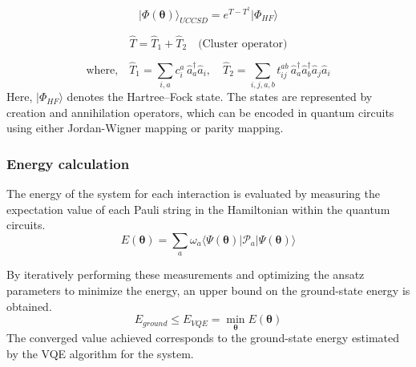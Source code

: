 \documentclass[pdflatex,sn-mathphys-num]{sn-jnl}%
\theoremstyle{thmstyleone}%
\theoremstyle{thmstyletwo}%
\theoremstyle{thmstylethree}%
\begin{document}
\begin{equation}
\vert \Phi(\mathbf{\theta})\rangle_{UCCSD} = e^{T-T^{\dagger}}\vert \Phi_{HF} \rangle
\end{equation}

\begin{equation}
\hat{T} = \hat{T}_1 + \hat{T}_2 \quad \text{(Cluster operator)}
\end{equation}

\begin{equation*}
\text{where,} \quad 
\hat{T}_1 = \sum_{i,a} c_i^a \, \hat{a}_a^{\dagger} \hat{a}_i, \quad
\hat{T}_2 = \sum_{i,j,a,b} t_{ij}^{ab} \, \hat{a}_a^{\dagger} \hat{a}_b^{\dagger} \hat{a}_j \hat{a}_i
\end{equation*}
Here, $\lvert \Phi_{HF} \rangle$ denotes the Hartree–Fock state. The states are represented by creation and annihilation operators, which can be encoded in quantum circuits using either Jordan-Wigner mapping or parity mapping. 

\subsubsection{Energy calculation}\label{subsec2.2.3}

The energy of the system for each interaction is evaluated by measuring the expectation value of each Pauli string in the Hamiltonian within the quantum circuits. 
\begin{equation}
E(\mathbf{\theta}) = \sum_{a} \omega_a \langle \Psi(\mathbf{\theta}) \vert \mathcal{P}_a \vert \Psi(\mathbf{\theta}) \rangle
\end{equation}

By iteratively performing these measurements and optimizing the ansatz parameters to minimize the energy,
an upper bound on the ground-state energy is obtained. 
\begin{equation}
E_{ground}\leq E_{VQE} = \min_{\mathbf{\theta}} E(\mathbf{\theta})
\end{equation}
The converged  value achieved corresponds to the ground-state energy estimated by the VQE algorithm for the system.

\end{document}
